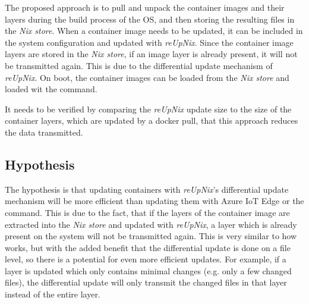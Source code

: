 The proposed approach is to pull and unpack the container images and their layers
during the build
process of the \ac{OS}, and then storing the resulting files in the
\textit{Nix store}. When a container image needs to be updated, it can
be included in the system configuration and updated with \textit{reUpNix}.
Since the container image layers are stored in the \textit{Nix store}, if an
image layer is already present, it will not be transmitted again. This is due
to the differential update mechanism of \textit{reUpNix}.
On boot, the container images can be loaded from the \textit{Nix store} and
loaded wit the  command.

It needs to be verified by comparing the \textit{reUpNix} update size to the size
of the container layers,
which are updated by a docker pull, that this approach reduces the data transmitted.

\subsection{Hypothesis}
The hypothesis is that updating containers with \textit{reUpNix}'s differential
update mechanism will be more efficient than updating them with Azure IoT Edge or
the  command. This is due to the fact, that if the
layers of the container image are extracted into the \textit{Nix store} and
updated with \textit{reUpNix}, a layer which is already present on the system
will not be transmitted again. This is very similar to how 
works, but with the added benefit that the differential update is done on a
file level, so there is a potential for even more efficient updates. For example,
if a layer is updated which only contains minimal changes (e.g. only a few
changed files), the differential update will only transmit the changed files in
that layer instead of the entire layer.
